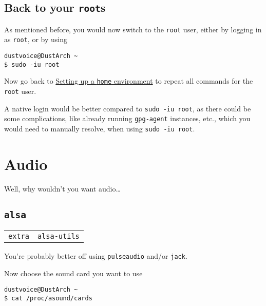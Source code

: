 \documentclass[9pt]{report}
\newenvironment{NOTE}
{\begin{tcolorbox}[colback=admonitionBG,coltitle=draculaFG,colframe=draculaBlue,colbacktitle=draculaBlue,title=NOTE]}
{\end{tcolorbox}}
\newenvironment{WARNING}
{\begin{tcolorbox}[colback=admonitionBG,coltitle=draculaBG,colframe=draculaOrange,colbacktitle=draculaOrange,title=WARNING]}
{\end{tcolorbox}}
\newenvironment{packagetable}
{\begin{longtabu}to \textwidth [b]{X[1,r]|X[1,l]}}
{\end{longtabu}}
\begin{document}
\newpage

\hypertarget{x-back-to-your-roots}{\subsection{Back to your \texttt{root}s}}
As mentioned before, you would now switch to the \texttt{root} user, either by logging in as \texttt{root}, or by using


\begin{verbatim}
dustvoice@DustArch ~
$ sudo -iu root
\end{verbatim}

Now go back to \hyperlink{setup-home}{Setting up a \texttt{home} environment} to repeat all commands for the \texttt{root} user.


\begin{WARNING}
    A native login would be better compared to \texttt{sudo -iu root}, as there could be some complications, like already running \texttt{gpg-agent} instances, etc., which you would need to manually resolve, when using \texttt{sudo -iu root}.

\end{WARNING}

\newpage

\hypertarget{x-audio}{\section{Audio}}
Well, why wouldn’t you want audio…​



\newpage

\hypertarget{x-alsa}{\subsection{\texttt{alsa}}}
\begin{packagetable}
    \texttt{extra} & \texttt{alsa-utils} \\ 
\end{packagetable}

\begin{NOTE}
    You’re probably better off using \texttt{pulseaudio} and/or \texttt{jack}.

\end{NOTE}
Now choose the sound card you want to use


\begin{verbatim}
dustvoice@DustArch ~
$ cat /proc/asound/cards
\end{verbatim}
\end{document}
